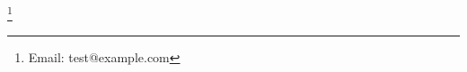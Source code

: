 \documentclass{ifacconf}
\begin{document}
\thanks[author-email-mylabel]{Email: test@example.com}
\end{document}
